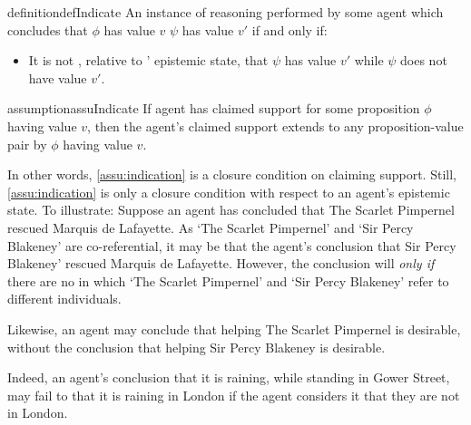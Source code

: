 \begin{note}
  \begin{restatable}[\indicateN{2}]{definition}{defIndicate}
    \label{def:indication}
    An instance of reasoning performed by some agent \vAgent{} which concludes that \(\phi\) has value \(v\) \emph{} \(\psi\) has value \(v'\) if and only if:
    \begin{itemize}
    \item It is not \epPAd{}, relative to \vAgent{}' epistemic state, that \(\psi\) has value \(v'\) while \(\psi\) does not have value \(v'\).
    \end{itemize}
    \vspace{-\baselineskip}
  \end{restatable}
\end{note}

\begin{note}
  \begin{restatable}[\indicateN{2}]{assumption}{assuIndicate}
    \label{assu:indication}
    If agent has claimed support for some proposition \(\phi\) having value \(v\), then the agent's claimed support extends to any proposition-value pair \indicateVed{} by \(\phi\) having value \(v\).
  \end{restatable}
\end{note}

\begin{note}
  In other words, \autoref{assu:indication} is a closure condition on claiming support.
  Still, \autoref{assu:indication} is only a closure condition with respect to an agent's epistemic state.
  To illustrate:
  Suppose an agent has concluded that The Scarlet Pimpernel rescued Marquis de Lafayette.
  As `The Scarlet Pimpernel' and `Sir Percy Blakeney' are co-referential, it may be that the agent's conclusion  that Sir Percy Blakeney' rescued Marquis de Lafayette.
  However, the conclusion will  \emph{only if} there are no  in which `The Scarlet Pimpernel' and `Sir Percy Blakeney' refer to different individuals.

  Likewise, an agent may conclude that helping The Scarlet Pimpernel is desirable, without the conclusion \indicatePr{} that helping Sir Percy Blakeney is desirable.

  Indeed, an agent's conclusion that it is raining, while standing in Gower Street, may fail to \indicateN{} that it is raining in London if the agent considers it \epPAd{} that they are not in London.
\end{note}

